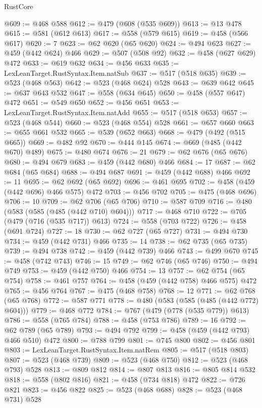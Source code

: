 \begin{lexlean}{RustCore}
\begin{coremodule}
@609 := @468 @588
@612 := @479 (@608 (@535 @609))
@613 := @13 @478
@615 := @581 (@612 @613)
@617 := @558 (@579 @615)
@619 := @458 (@566 @617)
@620 := 7
@623 := @62 @620 (@65 @620)
@624 := @494 @623
@627 := @459 (@442 @624) @466
@629 := @507 (@508 @92)
@632 := @458 (@627 @629) @472
@633 := @619 @632
@634 := @456 @633
@635 := LexLeanTarget.RustSyntax.Item.natSub
@637 := @517 (@518 @635)
@639 := @523 (@468 @563)
@642 := @523 (@468 @624) @528
@643 := @639 @642
@645 := @637 @643 @532
@647 := @558 (@634 @645)
@650 := @458 (@557 @647) @472
@651 := @549 @650
@652 := @456 @651
@653 := LexLeanTarget.RustSyntax.Item.natAdd
@655 := @517 (@518 @653)
@657 := @523 (@468 @544)
@660 := @523 (@468 @554) @528
@661 := @657 @660
@663 := @655 @661 @532
@665 := @539 (@652 @663)
@668 := @479 (@492 (@515 @665))
@669 := @482 @92
@670 := @444 @145
@674 := @669 (@485 (@442 @670) @489)
@675 := @480 @674
@676 := 21
@679 := @62 @676 (@65 @676)
@680 := @494 @679
@683 := @459 (@442 @680) @466
@684 := 17
@687 := @62 @684 (@65 @684)
@688 := @494 @687
@691 := @459 (@442 @688) @466
@692 := 11
@695 := @62 @692 (@65 @692)
@696 := @461 @695
@702 := @458 (@459 (@442 @696) @466 @575) @472
@703 := @456 @702
@705 := @475 (@468 @696)
@706 := 10
@709 := @62 @706 (@65 @706)
@710 := @587 @709
@716 := @480 (@583 (@585 (@485 (@442 @710) @604)))
@717 := @468 @710
@722 := @705 (@479 (@716 (@535 @717)) @613)
@724 := @558 (@703 @722)
@726 := @458 (@691 @724)
@727 := 18
@730 := @62 @727 (@65 @727)
@731 := @494 @730
@734 := @459 (@442 @731) @466
@735 := 14
@738 := @62 @735 (@65 @735)
@739 := @494 @738
@742 := @459 (@442 @739) @466
@743 := @499 @670
@745 := @458 (@742 @743)
@746 := 15
@749 := @62 @746 (@65 @746)
@750 := @494 @749
@753 := @459 (@442 @750) @466
@754 := 13
@757 := @62 @754 (@65 @754)
@758 := @461 @757
@764 := @458 (@459 (@442 @758) @466 @575) @472
@765 := @456 @764
@767 := @475 (@468 @758)
@768 := 12
@771 := @62 @768 (@65 @768)
@772 := @587 @771
@778 := @480 (@583 (@585 (@485 (@442 @772) @604)))
@779 := @468 @772
@784 := @767 (@479 (@778 (@535 @779)) @613)
@786 := @558 (@765 @784)
@788 := @458 (@753 @786)
@789 := 16
@792 := @62 @789 (@65 @789)
@793 := @494 @792
@799 := @458 (@459 (@442 @793) @466 @510) @472
@800 := @788 @799
@801 := @745 @800
@802 := @456 @801
@803 := LexLeanTarget.RustSyntax.Item.natRem
@805 := @517 (@518 @803)
@807 := @523 (@468 @739)
@809 := @523 (@468 @750)
@812 := @523 (@468 @793) @528
@813 := @809 @812
@814 := @807 @813
@816 := @805 @814 @532
@818 := @558 (@802 @816)
@821 := @458 (@734 @818) @472
@822 := @726 @821
@823 := @456 @822
@825 := @523 (@468 @688)
@828 := @523 (@468 @731) @528

\end{coremodule}
\end{lexlean}
